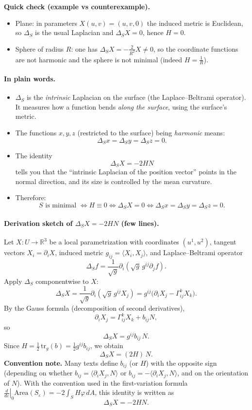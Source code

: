 \documentclass[12pt,a4paper]{article}
\theoremstyle{plain}
\theoremstyle{definition}      %
\begin{document}
\medskip
\textbf{Quick check (example vs counterexample).}
\begin{itemize}
	\item Plane: in parameters $X(u,v)=(u,v,0)$ the induced metric is Euclidean, so $\Delta_S$ is the usual Laplacian
	and $\Delta_S X=0$, hence $H=0$.
	\item Sphere of radius $R$: one has $\Delta_S X = -\frac{2}{R^2}X\neq 0$, so the coordinate functions are not harmonic
	and the sphere is not minimal (indeed $H=\frac{1}{R}$).
\end{itemize}

\paragraph{In plain words.}
\begin{itemize}
	\item $\Delta_S$ is the \emph{intrinsic} Laplacian on the surface (the Laplace--Beltrami operator).  
	It measures how a function bends \emph{along the surface}, using the surface's metric.
	
	\item The functions $x,y,z$ (restricted to the surface) being \emph{harmonic} means:
	\[
	\Delta_S x=\Delta_S y=\Delta_S z=0.
	\]
	
	\item The identity
	\[
	\Delta_S X=-2HN
	\]
	tells you that the ``intrinsic Laplacian of the position vector'' points in the normal direction,
	and its size is controlled by the mean curvature.
	
	\item Therefore:
	\[
	S \text{ is minimal } \Longleftrightarrow H\equiv 0
	\Longleftrightarrow \Delta_S X=0
	\Longleftrightarrow \Delta_S x=\Delta_S y=\Delta_S z=0.
	\]
\end{itemize}

\paragraph{Derivation sketch of $\Delta_S X=-2HN$ (few lines).}
Let $X\colon U\to\mathbb{R}^3$ be a local parametrization with coordinates $(u^1,u^2)$,
tangent vectors $X_i=\partial_i X$, induced metric $g_{ij}=\langle X_i,X_j\rangle$,
and Laplace--Beltrami operator
\[
\Delta_S f=\frac{1}{\sqrt{g}}\partial_i\!\left(\sqrt{g}\,g^{ij}\partial_j f\right).
\]
Apply $\Delta_S$ componentwise to $X$:
\[
\Delta_S X=\frac{1}{\sqrt{g}}\partial_i\!\left(\sqrt{g}\,g^{ij}X_j\right)
= g^{ij}\bigl(\partial_i X_j-\Gamma^k_{ij}X_k\bigr).
\]
By the Gauss formula (decomposition of second derivatives),
\[
\partial_i X_j=\Gamma^k_{ij}X_k + b_{ij}N,
\]
so
\[
\Delta_S X=g^{ij}b_{ij}\,N.
\]
Since $H=\tfrac12\,\mathrm{tr}_g(b)=\tfrac12 g^{ij}b_{ij}$, we obtain
\[
\Delta_S X = (2H)\,N.
\]
\textbf{Convention note.} Many texts define $b_{ij}$ (or $H$) with the opposite sign (depending on whether
$b_{ij}=\langle \partial_i X_j,N\rangle$ or $b_{ij}=-\langle \partial_i X_j,N\rangle$, and on the orientation of $N$).
With the convention used in the first-variation formula
$\left.\tfrac{d}{d\varepsilon}\right|_0\!\mathrm{Area}(S_\varepsilon)=-2\int_S H\varphi\,dA$,
this identity is written as
\[
\Delta_S X = -2HN.
\]
\end{document}
